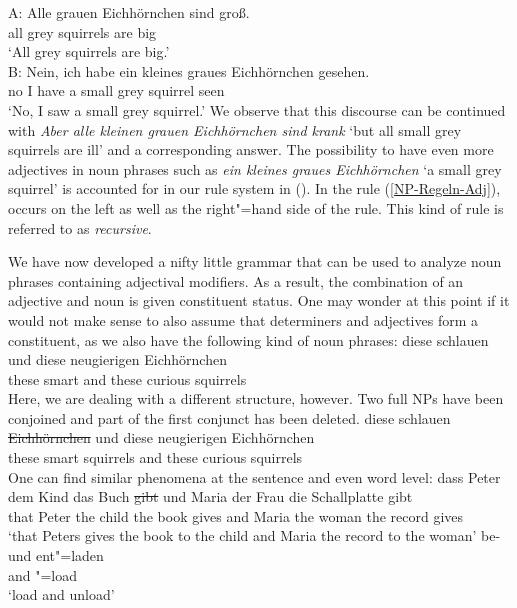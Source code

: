 \ea
\label{Beispiel-Iteration-Adjektive}
\gll A: Alle grauen Eichhörnchen sind groß.\\
\spacebr{} all grey squirrels are big\\
\glt {}`All grey squirrels are big.'\\
\gll B: Nein, ich habe ein kleines graues Eichhörnchen gesehen.\\
	\spacebr{} no I have a small grey squirrel seen\\
\glt {}`No, I saw a small grey squirrel.'
\z
We observe that this discourse can be continued with \emph{Aber alle kleinen grauen Eichhörnchen
  sind krank} `but all small grey squirrels are ill' and a corresponding answer. The possibility
  to have even more adjectives in noun phrases such as \emph{ein kleines graues Eichhörnchen} `a
  small grey squirrel' is accounted for in our rule system in (). In the rule
  (\ref{NP-Regeln-Adj}), \nbar occurs on the left as well as the right"=hand 
  side of the rule. This kind of rule is referred to as \emph{recursive}.

We have now developed a nifty little grammar that can be used to analyze noun phrases containing
adjectival modifiers. As a result, the combination of an adjective and noun is given constituent
status. One may wonder at this point if it would not make sense to also assume that determiners and
adjectives form a constituent, as we also have the following kind of noun phrases: 
\ea
\gll diese schlauen und diese neugierigen Eichhörnchen\\
     these smart    and these curious     squirrels\\
\z
Here, we are dealing with a different structure, however. Two full NPs have been
conjoined and part of the first conjunct has been deleted.
\ea
\gll diese schlauen \st{Eichhörnchen} und diese neugierigen Eichhörnchen\\
     these smart    squirrels         and these curious     squirrels\\
\z
One can find similar phenomena at the sentence and even word level:
\eal
\ex 
\gll dass Peter dem Kind das Buch \st{gibt} und Maria der Frau die Schallplatte gibt\\
	 that Peter the child the book gives and Maria the woman the record gives\\
\glt `that Peters gives the book to the child and Maria the record to the woman'
\ex 
\gll be- und ent"=laden\\
	 \prfx{} and \prfx{}"=load\\
\glt `load and unload'
\zl

